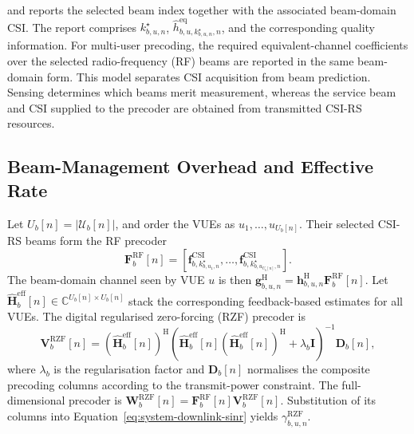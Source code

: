 and reports the selected beam index together with the associated beam-domain
CSI.  The report comprises \(k^{\star}_{b,u,n}\),
\(\widehat{h}^{\mathrm{eq}}_{b,u,k^{\star}_{b,u,n},n}\), and the corresponding
quality information.  For multi-user precoding, the required equivalent-channel
coefficients over the selected radio-frequency (RF) beams are reported in the same beam-domain
form.  This model separates CSI acquisition from beam prediction.  Sensing
determines which beams merit measurement, whereas the service beam and CSI
supplied to the precoder are obtained from transmitted CSI-RS resources.

\subsection{Beam-Management Overhead and Effective Rate}
\label{subsec:system-beam-management}

Let \(U_b[n]=|\mathcal{U}_b[n]|\), and order the VUEs as
\(u_1,\ldots,u_{U_b[n]}\).  Their selected CSI-RS beams form the RF precoder
\begin{equation}
    \mathbf{F}^{\mathrm{RF}}_b[n]
    =\left[\mathbf{f}^{\mathrm{CSI}}_{b,k^{\star}_{b,u_1,n}},
    \ldots,
    \mathbf{f}^{\mathrm{CSI}}_{b,k^{\star}_{b,u_{U_b[n]},n}}\right].
    \label{eq:system-rf-precoder}
\end{equation}
The beam-domain channel seen by VUE \(u\) is then
\(\mathbf{g}^{\mathrm{H}}_{b,u,n}=\mathbf{h}^{\mathrm{H}}_{b,u,n}
\mathbf{F}^{\mathrm{RF}}_b[n]\).  Let
\(\widehat{\mathbf{H}}^{\mathrm{eff}}_b[n]\in
\mathbb{C}^{U_b[n]\times U_b[n]}\) stack the corresponding feedback-based
estimates for all VUEs.  The digital regularised zero-forcing (RZF) precoder is
\begin{equation}
    \mathbf{V}^{\mathrm{RZF}}_b[n]
    =
    \left(\widehat{\mathbf{H}}^{\mathrm{eff}}_b[n]\right)^{\mathrm{H}}
    \left(\widehat{\mathbf{H}}^{\mathrm{eff}}_b[n]
    \left(\widehat{\mathbf{H}}^{\mathrm{eff}}_b[n]\right)^{\mathrm{H}}
    +\lambda_b\mathbf{I}\right)^{-1}\mathbf{D}_b[n],
    \label{eq:system-rzf-precoder}
\end{equation}
where \(\lambda_b\) is the regularisation factor and \(\mathbf{D}_b[n]\)
normalises the composite precoding columns according to the transmit-power
constraint.  The full-dimensional precoder is
\(\mathbf{W}^{\mathrm{RZF}}_b[n]=\mathbf{F}^{\mathrm{RF}}_b[n]
\mathbf{V}^{\mathrm{RZF}}_b[n]\).  Substitution of its columns into
Equation~\eqref{eq:system-downlink-sinr} yields
\(\gamma^{\mathrm{RZF}}_{b,u,n}\).

